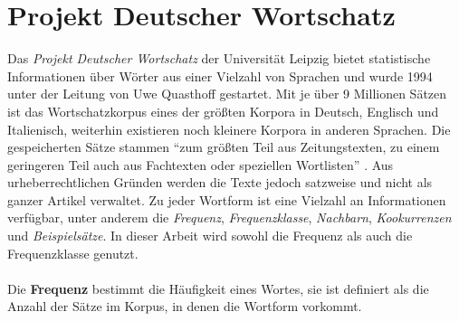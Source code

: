 \section{Projekt Deutscher Wortschatz}\label{sec:wortschatz}
Das \emph{Projekt Deutscher Wortschatz} der Universität Leipzig bietet statistische Informationen über Wörter aus einer Vielzahl von Sprachen
und wurde 1994 unter der Leitung von Uwe Quasthoff gestartet.
Mit je über 9 Millionen Sätzen ist das Wortschatzkorpus eines der größten Korpora in Deutsch, Englisch und Italienisch,
weiterhin existieren noch kleinere Korpora in anderen Sprachen.
Die gespeicherten Sätze stammen "`zum größten Teil aus Zeitungstexten, zu einem geringeren Teil auch aus
Fachtexten oder speziellen Wortlisten"' \cite[Seite 1]{wortschatz}.
Aus urheberrechtlichen Gründen werden die Texte jedoch satzweise und nicht als ganzer Artikel verwaltet.
Zu jeder Wortform ist eine Vielzahl an Informationen verfügbar, unter anderem die \emph{Frequenz}, \emph{Frequenzklasse}, \emph{Nachbarn}, \emph{Kookurrenzen} und \emph{Beispielsätze}.
In dieser Arbeit wird sowohl die Frequenz als auch die Frequenzklasse genutzt.
\paragraph{}
Die \textbf{Frequenz} bestimmt die Häufigkeit eines Wortes, sie ist definiert als die Anzahl der Sätze im Korpus, in denen die Wortform vorkommt.

